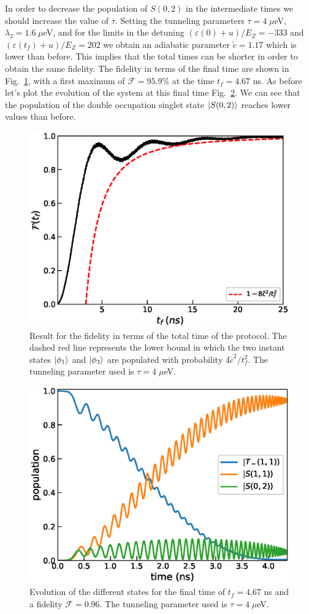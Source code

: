 \documentclass[a4paper,11pt]{article}
\begin{document}
In order to decrease the population of $S(0,2)$ in the intermediate times we should increase the value of $\tau$. Setting the tunneling parameters $\tau=4 \; \mu$eV, $\lambda_2=1.6\;\mu$eV, and for the limits in the detuning $(\varepsilon(0)+u)/E_Z=-333$ and $(\varepsilon(t_f)+u)/E_Z=202$ we obtain an adiabatic parameter $\tilde{c}=1.17$ which is lower than before. This implies that the total times can be shorter in order to obtain the same fidelity. The fidelity in terms of the final time are shown in Fig.~\ref{fig:FAQUAD_2QD_Results_2}, with a first maximum of $\mathcal{F}=95.9\%$ at the time $t_f=4.67$ ns. As before let's plot the evolution of the system at this final time Fig.~\ref{fig:states_evolution_2}. We can see that the population of the double occupation singlet state $\ket{S(0,2)}$ reaches lower values than before.
\begin{figure}[!htbp]
	\centering
	\includegraphics[width=0.7\linewidth]{FAQUAD_2QD_Results_2.eps}
	\caption{Result for the fidelity in terms of the total time of the protocol. The dashed red line represents the lower bound in which the two instant states $\ket{\phi_1}$ and $\ket{\phi_3}$ are populated with probability $4\tilde{c}^2/t_f^2$. The tunneling parameter used is $\tau=4\; \mu$eV.}
	\label{fig:FAQUAD_2QD_Results_2}
\end{figure}
\begin{figure}[!htbp]
	\centering
	\includegraphics[width=0.7\linewidth]{states_evolution_2.eps}
	\caption{Evolution of the different states for the final time of $t_f=4.67$ ns and a fidelity $\mathcal{F}=0.96$. The tunneling parameter used is $\tau=4\; \mu$eV.}
	\label{fig:states_evolution_2}
\end{figure}\\
\end{document}
